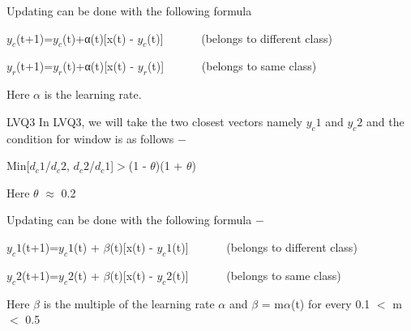 \documentclass{beamer}
\begin{document}
\begin{frame}
Updating can be done with the following formula 

 \vspace{2 mm}
$y_c$(t+1)=$y_c$(t)+α(t)[x(t) - $y_c$(t)]   \ \ \ \ \ \ (belongs to different class)

 \vspace{2 mm}
$y_r$(t+1)=$y_r$(t)+α(t)[x(t) - $y_r$(t)]   \ \ \ \ \ \ (belongs to same class)

 \vspace{2 mm}
Here $\alpha$ is the learning rate.
\end{frame}

\begin{frame}{LVQ3}
In LVQ3, we will take the two closest vectors namely $y_c1$ and $y_c2$ and the condition for window is as follows −
 \vspace{2 mm}
 
Min[$d_c1$/$d_c2$, $d_c2$/$d_c1$]$>$(1 - $\theta$)(1 + $\theta$)
 \vspace{2 mm}
 
Here $\theta$ $\approx$ 0.2

 \vspace{2 mm}
Updating can be done with the following formula −

 \vspace{2 mm}
$y_c1$(t+1)=$y_c1$(t) + $\beta$(t)[x(t) - $y_c1$(t)]       \ \ \ \ \ \ (belongs to different class)



 \vspace{2 mm}
$y_c2$(t+1)=$y_c2$(t) + $\beta$(t)[x(t) - $y_c2$(t)]          \ \ \ \ \ \ (belongs to same class)



 \vspace{2 mm}
Here $\beta$
is the multiple of the learning rate $\alpha$ and $\beta$ = m$\alpha$(t) for every 0.1 $<$ m $<$ 0.5
\end{frame}
\end{document}
